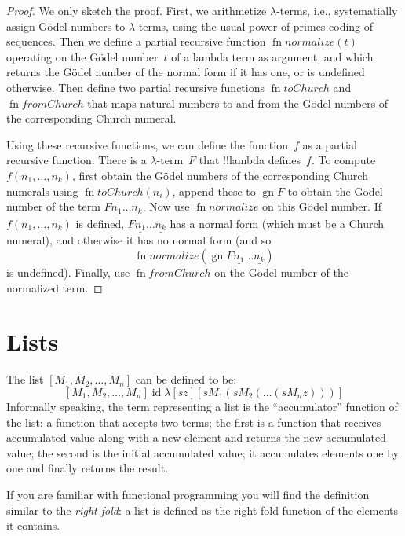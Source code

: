 \documentclass[10pt,a4paper]{article}
\theoremstyle{plain}
\theoremstyle{definition}
\theoremstyle{remark}
\newenvironment{digress}{}{}
\newcommand*{\olfileid}[3]{}
\newcommand*{\olsection}[1]{\section*{#1}}
\providecommand{\num}[1]{\underline{#1}}
\providecommand{\lambd}{\ensuremath{\lambda}}
\providecommand{\Gn}{\operatorname{gn}}
\providecommand{\ident}{\operatorname{id}}
\providecommand{\fn}{\operatorname{fn}}
\providecommand{\fn}{\operatorname{fn}}
\begin{document}
\begin{proof}
  We only sketch the proof. First, we arithmetize $\lambd$-terms,
  i.e., systematially assign G\"odel numbers to $\lambd$-terms, using
  the usual power-of-primes coding of sequences. Then we define a
  partial recursive function $\fn{normalize}(t)$ operating on the
  G\"odel number~$t$ of a lambda term as argument, and which returns
  the G\"odel number of the normal form if it has one, or is undefined
  otherwise.  Then define two partial recursive functions
  $\fn{toChurch}$ and $\fn{fromChurch}$ that maps natural numbers to
  and from the G\"odel numbers of the corresponding Church numeral.

  Using these recursive functions, we can define the function~$f$ as a
  partial recursive function. There is a $\lambd$-term~$F$ that
  !!{lambda define}s~$f$. To compute $f(n_1, \dots, n_k)$, first obtain
  the G\"odel numbers of the corresponding Church numerals using
  $\fn{toChurch}(n_i)$, append these to $\Gn{F}$ to obtain the G\"odel
  number of the term $F \num{n_1}\dots\num{n_k}$. Now use
  $\fn{normalize}$ on this G\"odel number. If $f(n_1, \dots, n_k)$ is
  defined, $F \num{n_1}\dots\num{n_k}$ has a normal form (which must
  be a Church numeral), and otherwise it has no normal form (and so
  \[\fn{normalize}(\Gn{F\num{n_1}\dots\num{n_k}})\] is undefined).
  Finally, use $\fn{fromChurch}$ on the G\"odel number of the
  normalized term.
\end{proof}





\olfileid{lam}{ldf}{lst}
\olsection{Lists}

The list $[M_1, M_2, \ldots, M_n]$ can be defined to be:
\[
  [M_1, M_2, \ldots, M_n] \ident \lambd[sz][s M_1 (s M_2 (\ldots (s M_n z)))]
\]
Informally speaking, the term representing a list is the
``accumulator'' function of the list: a function that accepts two
terms; the first is a function that receives accumulated value along
with a new element and returns the new accumulated value; the second
is the initial accumulated value; it accumulates elements one by one
and finally returns the result.

\begin{digress}
  If you are familiar with functional programming you will find the
  definition similar to the \emph{right fold}: a list is defined as
  the right fold function of the elements it contains.
\end{digress}
\end{document}
